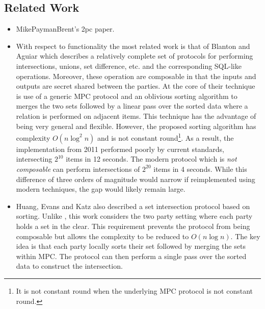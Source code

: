 \subsection{Related Work}

\begin{itemize}
	\item MikePaymanBrent's 2pc paper.

\item With respect to functionality the most related work is that of Blanton and Aguiar\cite{BA11} which describes a relatively complete set of protocols for performing intersections, unions, set difference, etc. and the corresponding SQL-like operations. Moreover, these operation are composable in that the inputs and outputs are secret shared between the parties. At the core of their technique is use of a generic MPC protocol and an oblivious sorting algorithm to merges the two sets followed by a linear pass over the sorted data where a relation is performed on adjacent items. This technique has the advantage of being very general and flexible. However, the proposed sorting algorithm has complexity $O(n \log^2 n)$ and is not constant round\footnote{It is not constant round when the underlying MPC protocol is not constant round.}. As a result, the implementation from 2011 performed poorly by current standards, intersecting $2^{10}$ items in 12 seconds. The modern protocol \cite{kkrt} which is \emph{not composable} can perform intersections of $2^{20}$ items in 4 seconds. While this difference of three orders of magnitude would narrow if reimplemented using modern techniques, the gap would likely remain large.

\item  Huang, Evans and Katz\cite{HEK12} also described a set intersection protocol based on sorting. Unlike \cite{BA11}, this work considers the two party setting where each party holds a set in the clear. This requirement prevents the protocol from being composable but allows the complexity to be reduced to $O(n\log n)$. The key idea is that each party locally sorts their set followed by merging the sets within MPC. The protocol can then perform a single pass over the sorted data to construct the intersection. 


\end{itemize}
